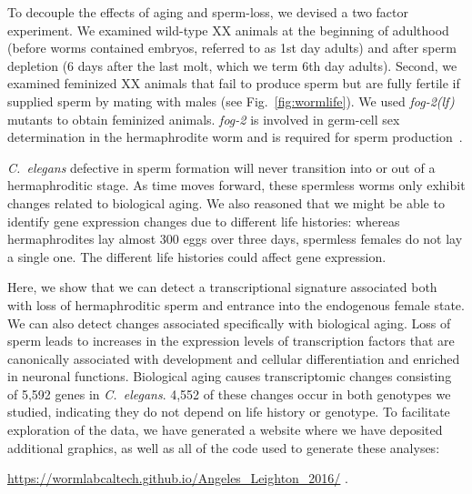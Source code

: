 \documentclass[10pt,letterpaper,twocolumn]{article}
\newcommand{\cel}{\emph{C.~elegans}}
\newcommand{\fog}{\emph{\mbox{fog-2(lf)}}}
\newcommand{\gene}[1]{\emph{\mbox{#1}}}
\newcommand{\agen}{5,592}
\newcommand{\website}{
            \url{https://wormlabcaltech.github.io/Angeles_Leighton_2016/}
            }
\begin{document}
To decouple the effects of aging and sperm-loss, we devised a two factor
experiment. We examined wild-type XX animals at the beginning of
adulthood (before worms contained embryos, referred to as 1st day adults) and
after sperm depletion (6 days after the last molt, which we term 6th day
adults). Second, we examined feminized XX animals that fail to produce sperm but
are fully fertile if supplied sperm by mating with males (see
Fig.~\ref{fig:wormlife}). We used \fog{} mutants to obtain feminized animals.
\gene{fog-2} is involved in germ-cell sex determination in the hermaphrodite
worm and is required for sperm production~\cite{Schedl1988,Clifford2000}.

\cel{} defective in sperm formation will never transition into or out of a
hermaphroditic stage. As time moves forward, these spermless worms only exhibit
changes related to biological aging. We also reasoned that we might be able to
identify gene expression changes due to different life histories: whereas
hermaphrodites lay almost 300 eggs over three days, spermless females do not lay
a single one. The different life histories could affect gene expression.

Here, we show that we can detect a transcriptional signature associated both
with loss of hermaphroditic sperm and entrance into the endogenous female state.
We can also detect changes associated specifically with biological aging.
Loss of sperm leads to increases in the expression levels of transcription
factors that are canonically associated with development and cellular
differentiation and enriched in neuronal functions.
Biological aging causes transcriptomic changes consisting of \agen{} genes
in \cel{}. 4,552 of these changes occur in both genotypes we studied,
indicating they do not depend on life history or genotype. To facilitate
exploration of the data, we have generated a website where we have deposited
additional graphics, as well as all of the code used to generate these analyses:
\website{}.
\end{document}
